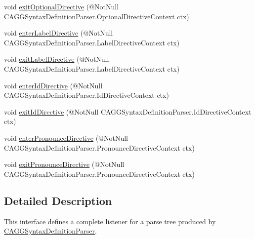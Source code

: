 \begin{DoxyCompactItemize}
\item 
void \hyperlink{interfaceit_1_1emarolab_1_1cagg_1_1core_1_1language_1_1parser_1_1ANTLRInterface_1_1ANTLRGenerate8f089aac366bd2683be460c907cc6185_a3c5303ef7c75089ee494bb60327f31a8}{exit\-Optional\-Directive} (@Not\-Null C\-A\-G\-G\-Syntax\-Definition\-Parser.\-Optional\-Directive\-Context ctx)
\item 
void \hyperlink{interfaceit_1_1emarolab_1_1cagg_1_1core_1_1language_1_1parser_1_1ANTLRInterface_1_1ANTLRGenerate8f089aac366bd2683be460c907cc6185_a1d27992be7c8d3299768173d46acdf5a}{enter\-Label\-Directive} (@Not\-Null C\-A\-G\-G\-Syntax\-Definition\-Parser.\-Label\-Directive\-Context ctx)
\item 
void \hyperlink{interfaceit_1_1emarolab_1_1cagg_1_1core_1_1language_1_1parser_1_1ANTLRInterface_1_1ANTLRGenerate8f089aac366bd2683be460c907cc6185_ade6e3670f76039197c590472b8d2d6c2}{exit\-Label\-Directive} (@Not\-Null C\-A\-G\-G\-Syntax\-Definition\-Parser.\-Label\-Directive\-Context ctx)
\item 
void \hyperlink{interfaceit_1_1emarolab_1_1cagg_1_1core_1_1language_1_1parser_1_1ANTLRInterface_1_1ANTLRGenerate8f089aac366bd2683be460c907cc6185_a11fb5fe01ca4e9cca687bf3888256f31}{enter\-Id\-Directive} (@Not\-Null C\-A\-G\-G\-Syntax\-Definition\-Parser.\-Id\-Directive\-Context ctx)
\item 
void \hyperlink{interfaceit_1_1emarolab_1_1cagg_1_1core_1_1language_1_1parser_1_1ANTLRInterface_1_1ANTLRGenerate8f089aac366bd2683be460c907cc6185_a91bd0c0edd80fc791913d026aa35fca1}{exit\-Id\-Directive} (@Not\-Null C\-A\-G\-G\-Syntax\-Definition\-Parser.\-Id\-Directive\-Context ctx)
\item 
void \hyperlink{interfaceit_1_1emarolab_1_1cagg_1_1core_1_1language_1_1parser_1_1ANTLRInterface_1_1ANTLRGenerate8f089aac366bd2683be460c907cc6185_a65efdee2078711a25d74ad6ce1f98e33}{enter\-Pronounce\-Directive} (@Not\-Null C\-A\-G\-G\-Syntax\-Definition\-Parser.\-Pronounce\-Directive\-Context ctx)
\item 
void \hyperlink{interfaceit_1_1emarolab_1_1cagg_1_1core_1_1language_1_1parser_1_1ANTLRInterface_1_1ANTLRGenerate8f089aac366bd2683be460c907cc6185_a30f609eaf6eb468a6d6afc2aeecea3c4}{exit\-Pronounce\-Directive} (@Not\-Null C\-A\-G\-G\-Syntax\-Definition\-Parser.\-Pronounce\-Directive\-Context ctx)
\end{DoxyCompactItemize}


\subsection{Detailed Description}
This interface defines a complete listener for a parse tree produced by \hyperlink{classit_1_1emarolab_1_1cagg_1_1core_1_1language_1_1parser_1_1ANTLRInterface_1_1ANTLRGenerated_1_1CAGGSyntaxDefinitionParser}{C\-A\-G\-G\-Syntax\-Definition\-Parser}. 

